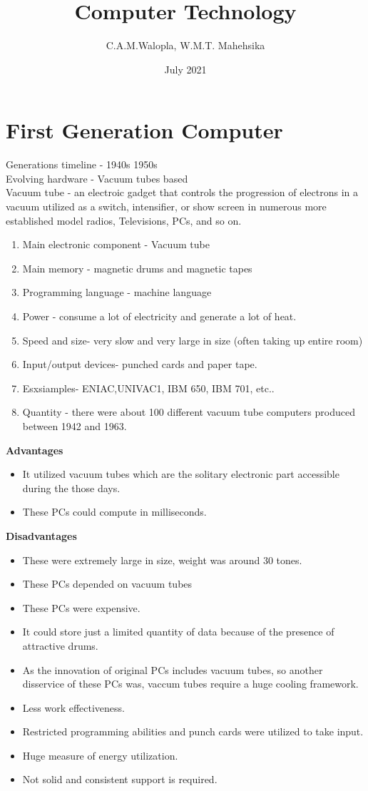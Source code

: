 \documentclass[a4paper,12pt]{article}
\begin{document}
\title{Computer Technology}
\author{C.A.M.Walopla, W.M.T. Mahehsika}
\date{July 2021}
\section{First Generation Computer} 
Generations timeline - 1940s 1950s \\ 
Evolving hardware - Vacuum tubes based \\ 
Vacuum tube - an electroic gadget that controls the progression of electrons in a vacuum utilized as a switch, intensifier, or show screen in numerous more established model radios, Televisions, PCs, and so on.

\begin{enumerate}
\item Main electronic component - Vacuum tube
\item Main memory - magnetic drums and magnetic tapes
\item Programming language - machine language
\item Power - consume a lot of electricity and generate a lot of heat.
\item Speed and size- very slow and very large in size (often taking up entire room)
\item Input/output devices- punched cards and paper tape.
\item Esxsiamples- ENIAC,UNIVAC1, IBM 650, IBM 701, etc..
\item Quantity - there were about 100 different vacuum tube computers produced between 1942 and 1963.
\end{enumerate}

\textbf{Advantages} \\ 
\begin{itemize}
\item It utilized vacuum tubes which are the solitary electronic part accessible during the those days.
\item These PCs could compute in milliseconds.
\end{itemize}

\textbf{Disadvantages}
\begin{itemize}
\item These were extremely large in size, weight was around 30 tones.
\item These PCs depended on vacuum tubes
\item These PCs were expensive.
\item It could store just a limited quantity of data because of the presence of attractive drums.
\item As the innovation of original PCs includes vacuum tubes, so another disservice of these PCs was, vaccum tubes require a huge cooling framework.
\item Less work effectiveness.
\item Restricted programming abilities and punch cards were utilized to take input.
\item Huge measure of energy utilization.
\item Not solid and consistent support is required.
\end{itemize}
\end{document}
